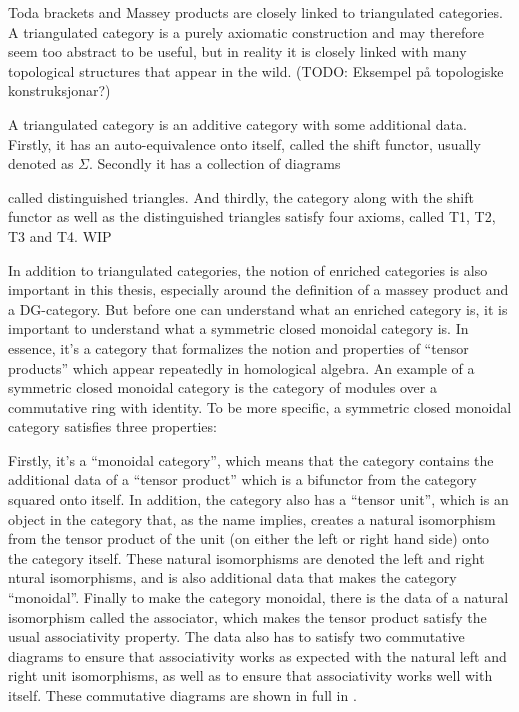 Toda brackets and Massey products are closely linked to triangulated categories. A triangulated category is a purely axiomatic construction and may therefore seem too abstract to be useful, but in reality it is closely linked with many topological structures that appear in the wild. (TODO: Eksempel på topologiske konstruksjonar?)

A triangulated category is an additive category with some additional data. Firstly, it has an auto-equivalence onto itself, called the shift functor, usually denoted as \( \Sigma \). Secondly it has a collection of diagrams
\begin{center}
\end{center}
called distinguished triangles. And thirdly, the category along with the shift functor as well as the distinguished triangles satisfy four axioms, called T1, T2, T3 and T4. WIP

In addition to triangulated categories, the notion of enriched categories is also important in this thesis, especially around the definition of a massey product and a DG-category. But before one can understand what an enriched category is, it is important to understand what a symmetric closed monoidal category is. In essence, it's a category that formalizes the notion and properties of ``tensor products'' which appear repeatedly in homological algebra. An example of a symmetric closed monoidal category is the category of modules over a commutative ring with identity. To be more specific, a symmetric closed monoidal category satisfies three properties:

Firstly, it's a ``monoidal category'', which means that the category contains the additional data of a ``tensor product'' which is a bifunctor from the category squared onto itself. In addition, the category also has a ``tensor unit'', which is an object in the category that, as the name implies, creates a natural isomorphism from the tensor product of the unit (on either the left or right hand side) onto the category itself. These natural isomorphisms are denoted the left and right ntural isomorphisms, and is also additional data that makes the category ``monoidal''. Finally to make the category monoidal, there is the data of a natural isomorphism called the associator, which makes the tensor product satisfy the usual associativity property. The data also has to satisfy two commutative diagrams to ensure that associativity works as expected with the natural left and right unit isomorphisms, as well as to ensure that associativity works well with itself. These commutative diagrams are shown in full in \cite[Diagram 6.1, Diagram 6.2]{Borceux_1994}.

